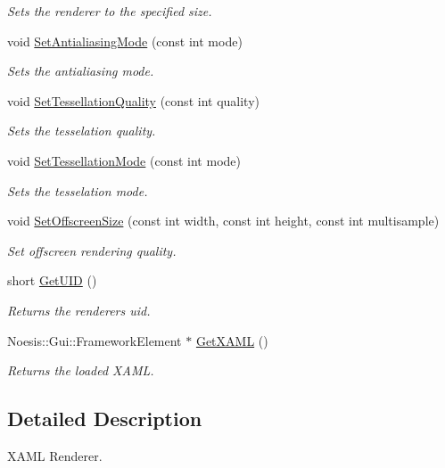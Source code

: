\begin{DoxyCompactItemize}
\begin{DoxyCompactList}\small\item\em Sets the renderer to the specified size. \end{DoxyCompactList}\item 
void \hyperlink{class_u_i_renderer_a05d5fed9d98c02a150efeb8e6ea36812}{Set\-Antialiasing\-Mode} (const int mode)
\begin{DoxyCompactList}\small\item\em Sets the antialiasing mode. \end{DoxyCompactList}\item 
void \hyperlink{class_u_i_renderer_a77ab17ad59e589eb32d55699ea1ab1c6}{Set\-Tessellation\-Quality} (const int quality)
\begin{DoxyCompactList}\small\item\em Sets the tesselation quality. \end{DoxyCompactList}\item 
void \hyperlink{class_u_i_renderer_a54d4d9236175ecca2568dffa8f6a60e6}{Set\-Tessellation\-Mode} (const int mode)
\begin{DoxyCompactList}\small\item\em Sets the tesselation mode. \end{DoxyCompactList}\item 
void \hyperlink{class_u_i_renderer_ad8eacb018b912e5d7786ca6f1642b4ce}{Set\-Offscreen\-Size} (const int width, const int height, const int multisample)
\begin{DoxyCompactList}\small\item\em Set offscreen rendering quality. \end{DoxyCompactList}\item 
short \hyperlink{class_u_i_renderer_a2c06181bfd9133704b5bdd17e1e1fd58}{Get\-U\-I\-D} ()
\begin{DoxyCompactList}\small\item\em Returns the renderers uid. \end{DoxyCompactList}\item 
Noesis\-::\-Gui\-::\-Framework\-Element $\ast$ \hyperlink{class_u_i_renderer_a64312ae42b4990ba165f9bea9dc85f48}{Get\-X\-A\-M\-L} ()
\begin{DoxyCompactList}\small\item\em Returns the loaded X\-A\-M\-L. \end{DoxyCompactList}\end{DoxyCompactItemize}


\subsection{Detailed Description}
X\-A\-M\-L Renderer. 

